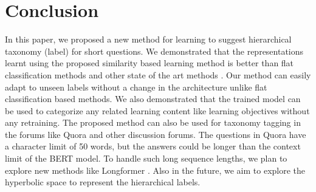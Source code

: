 \documentclass[runningheads, envcountsame, a4paper]{llncs}
\begin{document}
\section{Conclusion}
\setlength{\parindent}{0pt}
In this paper, we proposed a new method for learning to suggest hierarchical taxonomy (label) for short questions. We demonstrated that the representations learnt using the proposed similarity based learning method is better than flat classification methods and other state of the art methods \cite{twinbert}. Our method can easily adapt to unseen labels without a change in the architecture unlike flat classification based methods. We also demonstrated that the trained model can be used to categorize any related learning content like learning objectives without any retraining. The proposed method can also be used for taxonomy tagging in the forums like Quora and other discussion forums. The questions in Quora have a character limit of 50 words, but the answers could be longer than the context limit of the BERT model. To handle such long sequence lengths, we plan to explore new methods like Longformer \cite{beltagy2020longformer}. Also in the future, we aim to explore the hyperbolic space to represent the hierarchical labels.

\end{document}
